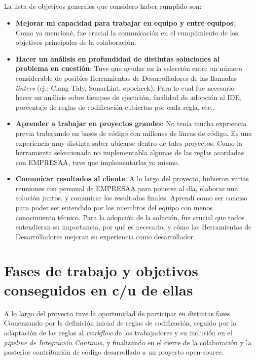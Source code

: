 \documentclass[12pt]{extreport} %
\begin{document}
\paragraph{}
La lista de objetivos generales que considero haber cumplido son:
\begin{itemize}
\item \textbf{Mejorar mi capacidad para trabajar en equipo y entre
  equipos}: Como ya mencioné, fue crucial la comunicación en el
  cumplimiento de los objetivos principales de la colaboración.
\item \textbf{Hacer un análisis en profundidad de distintas soluciones
  al problema en cuestión}: Tuve que ayudar en la selección entre un
  número considerable de posibles Herramientas de Desarrolladores de
  las llamadas \emph{linters} (ej.: Clang Tidy, SonarLint,
  cppcheck). Para lo cual fue necesario hacer un análisis sobre
  tiempos de ejecución, facilidad de adopción al IDE, porcentaje de
  reglas de codificación cubiertas por cada regla, etc..
\item \textbf{Aprender a trabajar en proyectos grandes}: No tenía
  mucha expriencia previa trabajando en bases de código con millones
  de líneas de código. Es una experiencia muy distinta saber ubicarse
  dentro de tales proyectos. Como la herramienta seleccionada no
  implementabla algunas de las reglas acordadas con EMPRESAA, tuve que
  implementarlas yo mismo.
\item \textbf{Comunicar resultados al cliente}: A lo largo del
  proyecto, hubieron varias reuniones con personal de EMPRESAA para
  ponerse al día, elaborar una solución juntos, y comunicar los
  resultados finales. Aprendí como ser conciso para poder ser
  entendido por los miembros del equipo con menos conocimiento
  técnico. Para la adopción de la solución, fue crucial que todos
  entendieran su importancia, por qué es necesario, y cómo las
  Herramientas de Desarrolladores mejoran su experiencia como
  desarrollador.
\end{itemize}


\chapter{Fases de trabajo y objetivos conseguidos en c/u de ellas}

A lo largo del proyecto tuve la oportunidad de participar en distintas
fases.  Comenzando por la definición inicial de reglas de
codificación, seguido por la adaptación de las reglas al
\emph{workflow} de los trabajadores y su inclusión en el
\emph{pipeline de Integración Contínua}, y finalizando en el cierre de
la colaboración y la posterior contribución de código desarrollado a
un proyecto open-source.
\end{document}
